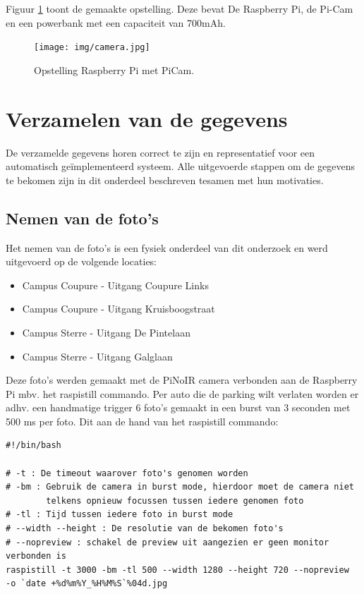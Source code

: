 Figuur \ref{Opstelling} toont de gemaakte opstelling. Deze bevat De Raspberry Pi, de Pi-Cam en een powerbank met een capaciteit van 700mAh.
\begin{figure}[h]
	\centering
	\texttt{[image: img/camera.jpg]}
	\caption{Opstelling Raspberry Pi met PiCam.}
	\label{Opstelling}
\end{figure}

\section{Verzamelen van de gegevens}
De verzamelde gegevens horen correct te zijn en representatief voor een automatisch geïmplementeerd systeem. Alle uitgevoerde stappen om de gegevens te bekomen zijn in dit onderdeel beschreven tesamen met hun motivaties.

\subsection{Nemen van de foto's}
Het nemen van de foto's is een fysiek onderdeel van dit onderzoek en werd uitgevoerd op de volgende locaties:
\begin{itemize}
	\item Campus Coupure - Uitgang Coupure Links
	\item Campus Coupure - Uitgang Kruisboogstraat
	\item Campus Sterre - Uitgang De Pintelaan
	\item Campus Sterre - Uitgang Galglaan
\end{itemize}

Deze foto's werden gemaakt met de PiNoIR camera verbonden aan de Raspberry Pi mbv. het raspistill commando. Per auto die de parking wilt verlaten worden er adhv. een handmatige trigger 6 foto's gemaakt in een burst van 3 seconden met 500 ms per foto. Dit aan de hand van het raspistill commando:  
\begin{verbatim}
#!/bin/bash

# -t : De timeout waarover foto's genomen worden
# -bm : Gebruik de camera in burst mode, hierdoor moet de camera niet 
        telkens opnieuw focussen tussen iedere genomen foto
# -tl : Tijd tussen iedere foto in burst mode
# --width --height : De resolutie van de bekomen foto's
# --nopreview : schakel de preview uit aangezien er geen monitor verbonden is
raspistill -t 3000 -bm -tl 500 --width 1280 --height 720 --nopreview
-o `date +%d%m%Y_%H%M%S`%04d.jpg
\end{verbatim}

